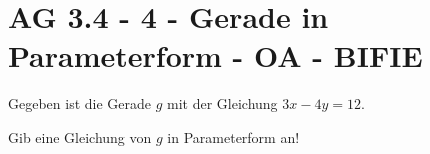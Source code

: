 \section{AG 3.4 - 4 - Gerade in Parameterform - OA - BIFIE}

\begin{beispiel}[AG 3.4]{1} %
Gegeben ist die Gerade $g$ mit der Gleichung $3x-4y=12$.

Gib eine Gleichung von $g$ in Parameterform an!

\end{beispiel}